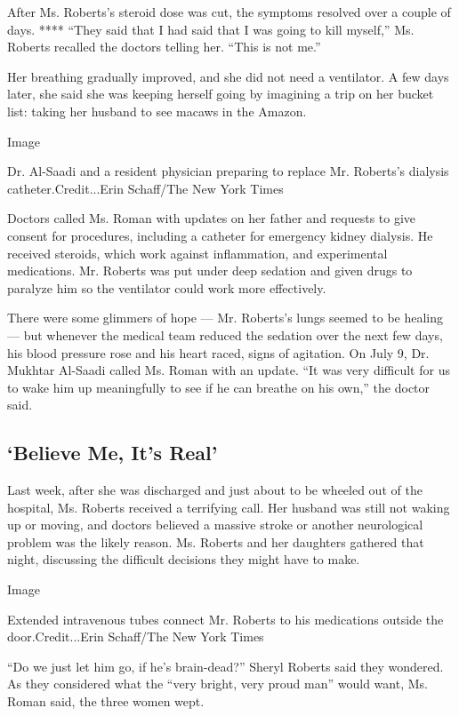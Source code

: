 After Ms. Roberts's steroid dose was cut, the symptoms resolved over a
couple of days. **** ``They said that I had said that I was going to
kill myself,'' Ms. Roberts recalled the doctors telling her. ``This is
not me.''

Her breathing gradually improved, and she did not need a ventilator. A
few days later, she said she was keeping herself going by imagining a
trip on her bucket list: taking her husband to see macaws in the Amazon.

Image

Dr. Al-Saadi and a resident physician preparing to replace Mr. Roberts's
dialysis catheter.Credit...Erin Schaff/The New York Times

Doctors called Ms. Roman with updates on her father and requests to give
consent for procedures, including a catheter for emergency kidney
dialysis. He received steroids, which work against inflammation, and
experimental medications. Mr. Roberts was put under deep sedation and
given drugs to paralyze him so the ventilator could work more
effectively.

There were some glimmers of hope --- Mr. Roberts's lungs seemed to be
healing --- but whenever the medical team reduced the sedation over the
next few days, his blood pressure rose and his heart raced, signs of
agitation. On July 9, Dr. Mukhtar Al-Saadi called Ms. Roman with an
update. ``It was very difficult for us to wake him up meaningfully to
see if he can breathe on his own,'' the doctor said.

\hypertarget{believe-me-its-real}{%
\subsection{`Believe Me, It's Real'}\label{believe-me-its-real}}

Last week, after she was discharged and just about to be wheeled out of
the hospital, Ms. Roberts received a terrifying call. Her husband was
still not waking up or moving, and doctors believed a massive stroke or
another neurological problem was the likely reason. Ms. Roberts and her
daughters gathered that night, discussing the difficult decisions they
might have to make.

Image

Extended intravenous tubes connect Mr. Roberts to his medications
outside the door.Credit...Erin Schaff/The New York Times

``Do we just let him go, if he's brain-dead?'' Sheryl Roberts said they
wondered. As they considered what the ``very bright, very proud man''
would want, Ms. Roman said, the three women wept.

